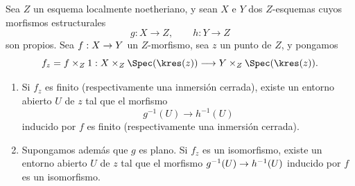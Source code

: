 \documentclass[oneside]{amsart}
\makeatletter
\newcommand{\ega@arrow}[2]{\mathchoice{#1}{#2}{#2}{#2}}
\renewcommand{\to}{\ega@arrow{\longrightarrow}{\rightarrow}}
\let\EGAOriginalLabel\label
\renewcommand{\label}[1]{\phantomsection\EGAOriginalLabel{#1}}
\makeatother
\begin{document}
\begin{proposition}[4.6.7]
\label{III.4.6.7}
Sea $Z$ un esquema localmente noetheriano, y sean $X$ e $Y$
dos $Z$-esquemas cuyos morfismos estructurales
\[
  g:X\longrightarrow Z,\qquad h:Y\longrightarrow Z
\]
son propios. Sea $f:X\to Y$ un $Z$-morfismo, sea $z$ un punto
de $Z$, y pongamos
\[
  f_z=f\times_Z1:
  X\times_Z\Spec(\kres(z))
  \longrightarrow
  Y\times_Z\Spec(\kres(z)).
\]
\begin{enumerate}
\item[\textup{(i)}] Si $f_z$ es finito \textup{(respectivamente} una inmersión cerrada),
  existe un entorno abierto $U$ de $z$ tal que el morfismo
  \[
    g^{-1}(U)\longrightarrow h^{-1}(U)
  \]
  inducido por $f$ es finito \textup{(respectivamente} una inmersión cerrada).
\item[\textup{(ii)}] Supongamos además que $g$ es plano. Si $f_z$ es un
  isomorfismo, existe un entorno abierto $U$ de $z$ tal que
  el morfismo $g^{-1}(U)\to h^{-1}(U)$ inducido por $f$ es un
  isomorfismo.
\end{enumerate}
\end{proposition}
\end{document}
